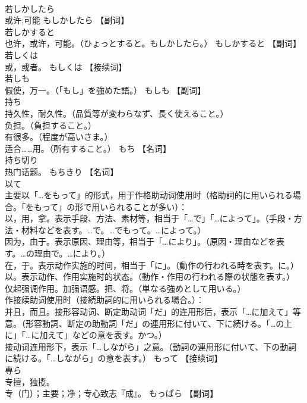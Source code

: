 \documentclass[8pt]{extreport}
\begin{document}
\begin{CJK}{UTF8}{min}
\\	若しかしたら	
\\	或许;可能	もしかしたら		【副词】
\\	若しかすると	
\\	也许，或许，可能。（ひょっとすると。もしかしたら。）	もしかすると		【副词】
\\	若しくは	
\\	或，或者。	もしくは		【接续词】
\\	若しも	
\\	假使，万一。（「もし」を強めた語。）	もしも		【副词】
\\	持ち	
\\	持久性，耐久性。（品質等が変わらなず、長く使えること。） 
\\	负担。（負担すること。） 
\\	有很多。（程度が高いさま。） 
\\	适合……用。（所有すること。）	もち		【名词】
\\	持ち切り	
\\	热门话题。	もちきり		【名词】
\\	以て	
\\	主要以「…をもって」的形式，用于作格助动词使用时（格助詞的に用いられる場合。「をもって」の形で用いられることが多い）： 
\\	以，用，拿。表示手段、方法、素材等，相当于「…で」「…によって」。（手段・方法・材料などを表す。…で。…でもって。…によって。） 
\\	因为，由于。表示原因、理由等，相当于「…により」。（原因・理由などを表す。…の理由で。…により。） 
\\	在，于。表示动作实施的时间，相当于「に」。（動作の行われる時を表す。に。） 
\\	以。表示动作、作用实施时的状态。（動作・作用の行われる際の状態を表す。） 
\\	仅起强调作用。加强语感。把、将。（単なる強めとして用いる。） 
\\	作接续助词使用时（接続助詞的に用いられる場合。）： 
\\	并且，而且。接形容动词、断定助动词「だ」的连用形后，表示「…に加えて」等意。（形容動詞、断定の助動詞「だ」の連用形に付いて、下に続ける。「…の上に」「…に加えて」などの意を表す。かつ。） 
\\	接动词连用形下，表示「…しながら」之意。（動詞の連用形に付いて、下の動詞に続ける。「…しながら」の意を表す。）	もって		【接续词】
\\	専ら	
\\	专擅，独揽。 
\\	专（门）；主要；净；专心致志『成』。	もっぱら		【副词】

\end{CJK}
\end{document}
